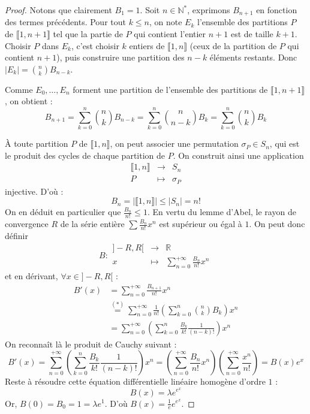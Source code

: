   \begin{proof}
    Notons que clairement $B_1 = 1$. Soit $n \in \mathbb{N}^*$, exprimons $B_{n+1}$ en fonction des termes précédents. Pour tout $k \leq n$, on note $E_k$ l'ensemble des partitions $P$ de $\llbracket 1, n+1 \rrbracket$ tel que la partie de $P$ qui contient l'entier $n+1$ est de taille $k+1$. Choisir $P$ dans $E_k$, c'est choisir $k$ entiers de $\llbracket 1, n \rrbracket$ (ceux de la partition de $P$ qui contient $n+1$), puis construire une partition des $n-k$ éléments restants. Donc $|E_k| = \binom{n}{k} B_{n-k}$.

    \medskip
    Comme $E_0, \dots, E_n$ forment une partition de l'ensemble des partitions de $\llbracket 1, n+1 \rrbracket$, on obtient :
    \[ B_{n+1} = \sum_{k=0}^n \binom{n}{k} B_{n-k} = \sum_{k=0}^n \binom{n}{n-k} B_k = \sum_{k=0}^n \binom{n}{k} B_k \tag{$*$} \]

    À toute partition $P$ de $\llbracket 1, n \rrbracket$, on peut associer une permutation $\sigma_P \in S_n$, qui est le produit des cycles de chaque partition de $P$. On construit ainsi une application
    \[
    \begin{array}{ccc}
      \llbracket 1, n \rrbracket &\rightarrow& S_n \\
      P &\mapsto& \sigma_P
    \end{array}
    \]
    injective. D'où :
    \[ B_n = |\llbracket 1, n \rrbracket| \leq |S_n| = n! \]
    On en déduit en particulier que $\frac{B_n}{n!} \leq 1$. En vertu du lemme d'Abel, le rayon de convergence $R$ de la série entière $\sum \frac{B_n}{n!} x^n$ est supérieur ou égal à $1$. On peut donc définir
    \[
    B :
    \begin{array}{ccc}
      ]-R,R[ &\rightarrow& \mathbb{R} \\
      x &\mapsto& \sum_{n=0}^{+\infty} \frac{B_n}{n!} x^n
    \end{array}
    \]
    et en dérivant, $\forall x \in ]-R,R[$ :
    \begin{align*}
      B'(x) &= \sum_{n=0}^{+\infty} \frac{B_{n+1}}{n!} x^n \\
      &\overset{(*)}{=} \sum_{n=0}^{+\infty} \frac{1}{n!} \left( \sum_{k=0}^n \binom{n}{k} B_k \right) x^n \\
      &= \sum_{n=0}^{+\infty} \left( \sum_{k=0}^n \frac{B_k}{k!} \frac{1}{(n-k)!} \right) x^n
    \end{align*}
    On reconnaît là le produit de Cauchy suivant :
    \[ B'(x) = \sum_{n=0}^{+\infty} \left( \sum_{k=0}^n \frac{B_k}{k!} \frac{1}{(n-k)!} \right) x^n = \left( \sum_{n=0}^{+\infty} \frac{B_n}{n!} x^n \right) \left( \sum_{n=0}^{+\infty} \frac{x^n}{n!} \right) = B(x) e^x \]
    Reste à résoudre cette équation différentielle linéaire homogène d'ordre $1$ :
    \[ B(x) = \lambda e^{e^x} \]
    Or, $B(0) = B_0 = 1 = \lambda e^1$. D'où $B(x) = \frac{1}{e} e^{e^x}$.


\end{proof}
